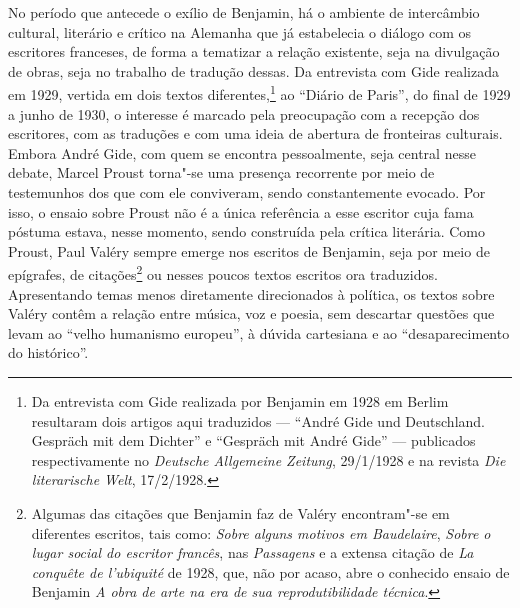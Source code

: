 No período que antecede o exílio de Benjamin, há o ambiente de
intercâmbio cultural, literário e crítico na Alemanha que já estabelecia
o diálogo com os escritores franceses, de forma a tematizar a relação
existente, seja na divulgação de obras, seja no trabalho de tradução
dessas. Da entrevista com Gide realizada em 1929, vertida em dois textos %
diferentes,\footnote{Da entrevista com Gide realizada por Benjamin em
  1928 em Berlim resultaram dois artigos aqui traduzidos --- ``André Gide
  und Deutschland. Gespräch mit dem Dichter'' e ``Gespräch mit André
  Gide'' --- publicados respectivamente no \emph{Deutsche Allgemeine
  Zeitung}, 29/1/1928 e na revista \emph{Die literarische Welt},
  17/2/1928.} ao ``Diário de %
Paris'', do final de 1929 a junho de 1930, o interesse é marcado pela %
preocupação com a recepção dos escritores, com as traduções e com uma
ideia de abertura de fronteiras culturais. Embora André Gide, com quem se encontra
pessoalmente, seja central nesse debate, Marcel Proust torna"-se uma presença
recorrente por meio de testemunhos dos que com ele conviveram, sendo
constantemente evocado. Por isso, o ensaio sobre Proust não é a única
referência a esse escritor cuja fama póstuma estava, nesse momento,
sendo construída pela crítica literária.
Como Proust, Paul Valéry sempre emerge nos escritos de Benjamin, seja
por meio de epígrafes, de citações\footnote{Algumas das citações que Benjamin faz de Valéry encontram"-se em diferentes escritos, tais como: \emph{Sobre alguns motivos em Baudelaire}, \emph{Sobre o lugar social do escritor francês}, nas \emph{Passagens} e a extensa citação de \emph{La conquête de l'ubiquité} de 1928, que, não por acaso, abre o conhecido ensaio de Benjamin \emph{A obra de arte na era de sua reprodutibilidade técnica}.} ou nesses poucos textos escritos ora
traduzidos. Apresentando temas menos diretamente direcionados à política, os textos sobre Valéry contêm a relação entre música, voz e poesia, sem descartar questões que levam ao ``velho humanismo europeu'', à dúvida cartesiana e ao ``desaparecimento do histórico''.

